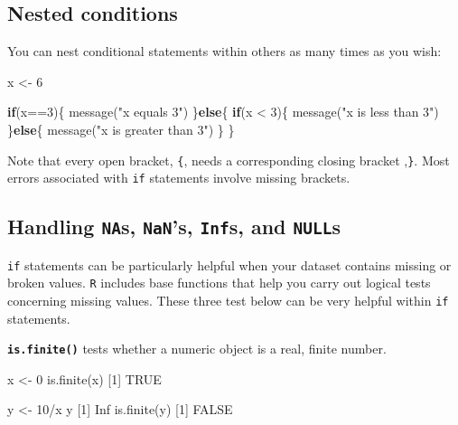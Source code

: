 \documentclass[
]{book}
\newenvironment{Shaded}{\begin{snugshade}}{\end{snugshade}}
\newcommand{\ConstantTok}[1]{\textcolor[rgb]{0.00,0.00,0.00}{#1}}
\newcommand{\ControlFlowTok}[1]{\textcolor[rgb]{0.13,0.29,0.53}{\textbf{#1}}}
\newcommand{\DecValTok}[1]{\textcolor[rgb]{0.00,0.00,0.81}{#1}}
\newcommand{\FunctionTok}[1]{\textcolor[rgb]{0.00,0.00,0.00}{#1}}
\newcommand{\NormalTok}[1]{#1}
\newcommand{\OtherTok}[1]{\textcolor[rgb]{0.56,0.35,0.01}{#1}}
\newcommand{\SpecialCharTok}[1]{\textcolor[rgb]{0.00,0.00,0.00}{#1}}
\newcommand{\StringTok}[1]{\textcolor[rgb]{0.31,0.60,0.02}{#1}}
\begin{document}
\hypertarget{nested-conditions}{%
\subsection*{Nested conditions}\label{nested-conditions}}

You can nest conditional statements within others as many times as you wish:

\begin{Shaded}
\begin{Highlighting}[]
\NormalTok{x }\OtherTok{\textless{}{-}} \DecValTok{6}

\ControlFlowTok{if}\NormalTok{(x}\SpecialCharTok{==}\DecValTok{3}\NormalTok{)\{}
  \FunctionTok{message}\NormalTok{(}\StringTok{"x equals 3"}\NormalTok{)}
\NormalTok{\}}\ControlFlowTok{else}\NormalTok{\{}
  \ControlFlowTok{if}\NormalTok{(x }\SpecialCharTok{\textless{}} \DecValTok{3}\NormalTok{)\{}
    \FunctionTok{message}\NormalTok{(}\StringTok{"x is less than 3"}\NormalTok{)}
\NormalTok{  \}}\ControlFlowTok{else}\NormalTok{\{  }
    \FunctionTok{message}\NormalTok{(}\StringTok{"x is greater than 3"}\NormalTok{)}
\NormalTok{  \}}
\NormalTok{\}}
\end{Highlighting}
\end{Shaded}

Note that every open bracket, \texttt{\{}, needs a corresponding closing bracket ,\texttt{\}}. Most errors associated with \texttt{if} statements involve missing brackets.

\hypertarget{handling-nas-nans-infs-and-nulls}{%
\subsection*{\texorpdfstring{Handling \texttt{NA}s, \texttt{NaN}'s, \texttt{Inf}s, and \texttt{NULL}s}{Handling NAs, NaN's, Infs, and NULLs}}\label{handling-nas-nans-infs-and-nulls}}

\texttt{if} statements can be particularly helpful when your dataset contains missing or broken values. \texttt{R} includes base functions that help you carry out logical tests concerning missing values. These three test below can be very helpful within \texttt{if} statements.

\textbf{\texttt{is.finite()}} tests whether a numeric object is a real, finite number.

\begin{Shaded}
\begin{Highlighting}[]
\NormalTok{x }\OtherTok{\textless{}{-}} \DecValTok{0}
\FunctionTok{is.finite}\NormalTok{(x)}
\NormalTok{[}\DecValTok{1}\NormalTok{] }\ConstantTok{TRUE}

\NormalTok{y }\OtherTok{\textless{}{-}} \DecValTok{10}\SpecialCharTok{/}\NormalTok{x}
\NormalTok{y}
\NormalTok{[}\DecValTok{1}\NormalTok{] }\ConstantTok{Inf}
\FunctionTok{is.finite}\NormalTok{(y)}
\NormalTok{[}\DecValTok{1}\NormalTok{] }\ConstantTok{FALSE}
\end{Highlighting}
\end{Shaded}
\end{document}
